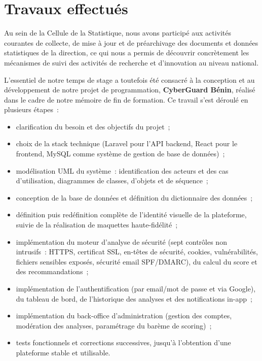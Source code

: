\section{Travaux effectu\'es}

Au sein de la Cellule de la Statistique, nous avons particip\'e aux activit\'es
courantes de collecte, de mise \`a jour et de pr\'earchivage des documents et
donn\'ees statistiques de la direction, ce qui nous a permis de d\'ecouvrir
concr\`etement les m\'ecanismes de suivi des activit\'es de recherche et
d'innovation au niveau national.

L'essentiel de notre temps de stage a toutefois \'et\'e consacr\'e \`a la
conception et au d\'eveloppement de notre projet de programmation,
\textbf{CyberGuard B\'enin}, r\'ealis\'e dans le cadre de notre m\'emoire de fin de
formation. Ce travail s'est d\'eroul\'e en plusieurs \'etapes~:

\begin{itemize}[nosep]
  \item clarification du besoin et des objectifs du projet~;
  \item choix de la stack technique (Laravel pour l'API backend, React pour le
    frontend, MySQL comme syst\`eme de gestion de base de donn\'ees)~;
  \item mod\'elisation UML du syst\`eme~: identification des acteurs et des cas
    d'utilisation, diagrammes de classes, d'objets et de s\'equence~;
  \item conception de la base de donn\'ees et d\'efinition du dictionnaire des
    donn\'ees~;
  \item d\'efinition puis red\'efinition compl\`ete de l'identit\'e visuelle de la
    plateforme, suivie de la r\'ealisation de maquettes haute-fid\'elit\'e~;
  \item impl\'ementation du moteur d'analyse de s\'ecurit\'e (sept contr\^oles non
    intrusifs~: HTTPS, certificat SSL, en-t\^etes de s\'ecurit\'e, cookies,
    vuln\'erabilit\'es, fichiers sensibles expos\'es, s\'ecurit\'e email SPF/DMARC),
    du calcul du score et des recommandations~;
  \item impl\'ementation de l'authentification (par email/mot de passe et via
    Google), du tableau de bord, de l'historique des analyses et des
    notifications in-app~;
  \item impl\'ementation du back-office d'administration (gestion des comptes,
    mod\'eration des analyses, param\'etrage du bar\`eme de scoring)~;
  \item tests fonctionnels et corrections successives, jusqu'\`a l'obtention
    d'une plateforme stable et utilisable.
\end{itemize}

